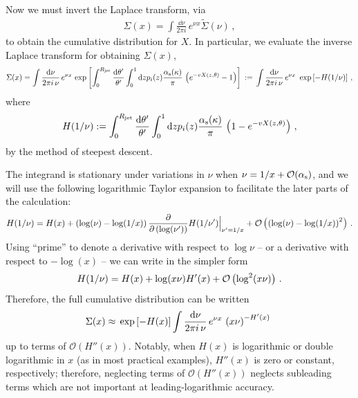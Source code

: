 \begin{enumerate}[label=\alph*)]
    Now we must invert the Laplace transform, via
    \begin{align}
        \Sigma(x) = \int \frac{\dd \nu}{2\pi i} \, e^{\nu x} \widetilde\Sigma(\nu)
        \,,
    \end{align}
    to obtain the cumulative distribution for \(X\).
    In particular, we evaluate the inverse Laplace transform for obtaining \(\Sigma(x)\),
    \begin{align}
        \Sigma(x)
        =
        \int \frac{\dd \nu}{2\pi i\, \nu} \, e^{\nu x}
        \,
        \exp\left[
            \int_0^{R_\text{jet}} \frac{\dd \theta'}{\theta'}
            \int_0^1 \dd z p_i(z)
            \frac{\alpha_{\mathrm{s}}(\kappa)}{\pi}
            \,
            \left(e^{-v X(z, \theta)} - 1\right)
        \right]
        \,
        :=
        \,
        \int \frac{\dd \nu}{2\pi i\, \nu} \, e^{\nu x}
        \,\,
        \exp \left[-H(1/\nu)\right]
        \,,
    \end{align}
    where
    \begin{align}
        \label{eq:H-radiator-def}
        H(1/\nu)
        :=
        \int_0^{\Rjet} \frac{\dd \theta'}{\theta'}
        \int_0^1 \dd z p_i(z)
        \frac{\alphas(\kappa)}{\pi}
        \,
        \le(1-e^{-v X(z, \theta)}\ri)
        \,,
    \end{align}
    by the method of steepest descent.

    The integrand is stationary under variations in \(\nu\) when \(\nu = 1/x + \mathcal{O}(\alpha_{\mathrm{s}})\), and we will use the following logarithmic Taylor expansion to facilitate the later parts of the calculation:
    \begin{align}
        \label{eq:steepest-descent-expansion-i}
        H(1/\nu)
        =
        H(x)
        +
        \le(\log(\nu) - \log(1/x)\ri)
        \frac{\partial}{\partial\le(\log(\nu')\ri)} H(1/\nu') \Big|_{\nu'=1/x}
        +
        \mathcal{O}\le(\le(\log(\nu) - \log(1/x)\ri)^2\ri)
        \,.
    \end{align}
    Using ``prime'' to denote a derivative with respect to \(\log \nu\) -- or a derivative with respect to \(-\log(x)\) -- we can write  in the simpler form
    \begin{align}
        \label{eq:steepest-descent-expansion-ii}
        H(1/\nu)
        =
        H(x)
        +
        \log(x\nu) H'(x)
        +
        \mathcal{O}\le(\log^2(x\nu)\ri)
        \,.
    \end{align}
    Therefore, the full cumulative distribution can be written
    \begin{align}
        \Sigma(x)
        \approx
        \,
        \exp\left[-H(x)\right]
        \int \frac{\dd \nu}{2\pi i\, \nu} \, e^{\nu x}
        \,\left(x\nu\right)^{-H'(x)}
        \,\,
    \end{align}
    up to terms of \(\mathcal{O}(H''(x))\).
    Notably, when \(H(x)\) is logarithmic or double logarithmic in \(x\) (as in most practical examples), \(H''(x)\) is zero or constant, respectively;
    therefore, neglecting terms of \(\mathcal{O}(H''(x))\) neglects subleading terms which are not important at leading-logarithmic accuracy.



\end{enumerate}
